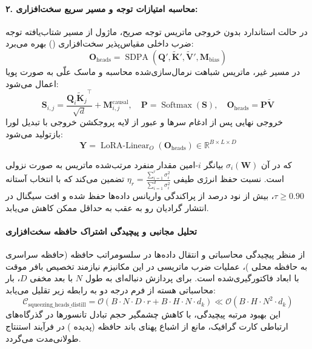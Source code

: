 \paragraph{۲. محاسبه امتیازات توجه و مسیر سریع سخت‌افزاری:}
در حالت استاندارد بدون خروجی ماتریس توجه صریح، ماژول از مسیر شتاب‌یافته توجه ضرب داخلی مقیاس‌پذیر سخت‌افزاری () بهره می‌برد:
\begin{equation}
\mathbf{O}_{\text{heads}} = \operatorname{SDPA}\left(\mathbf{Q}', \tilde{\mathbf{K}}', \tilde{\mathbf{V}}', \mathbf{M}_{\text{bias}}\right)
\end{equation}
در مسیر غیر‌، ماتریس شباهت نرمال‌سازی‌شده محاسبه و ماسک علّی به صورت پویا اعمال می‌شود:
\begin{equation}
\mathbf{S}_{i, j} = \frac{\mathbf{Q}_i {\tilde{\mathbf{K}}_j}^\top}{\sqrt{d}} + \mathbf{M}_{i, j}^{\text{causal}}, \quad \mathbf{P} = \operatorname{Softmax}(\mathbf{S}), \quad \mathbf{O}_{\text{heads}} = \mathbf{P} \tilde{\mathbf{V}}
\end{equation}
خروجی نهایی پس از ادغام سرها و عبور از لایه پروجکشن خروجی با تبدیل لورا بازتولید می‌شود:
\begin{equation}
\mathbf{Y} = \operatorname{LoRA-Linear}_O(\mathbf{O}_{\text{heads}}) \in \mathbb{R}^{B \times L \times D}
\end{equation}

که در آن $\sigma_i(\mathbf{W})$ بیانگر $i$-امین مقدار منفرد مرتب‌شده ماتریس به صورت نزولی است. نسبت حفظ انرژی طیفی $\eta_r = \frac{\sum_{i=1}^r \sigma_i^2}{\sum_{i=1}^{d} \sigma_i^2}$ تضمین می‌کند که با انتخاب آستانه $\tau \ge 0.90$، بیش از نود درصد از پراکندگی واریانس داده‌ها حفظ شده و افت سیگنال در انتشار گرادیان رو به عقب به حداقل ممکن کاهش می‌یابد.

\paragraph{تحلیل مجانبی و پیچیدگی اشتراک حافظه سخت‌افزاری}
از منظر پیچیدگی محاسباتی و انتقال داده‌ها در سلسومراتب حافظه (حافظه سراسری  به حافظه محلی )، عملیات ضرب ماتریسی در این مکانیزم نیازمند تخصیص بافر موقت با ابعاد فاکتورگیری‌شده است. برای پردازش دنباله‌ای به طول $N$ با بعد مخفی $D$، بار محاسباتی هسته از فرم درجه دو به رابطه زیر تقلیل می‌یابد:
\begin{equation}
\label{eq:complexity_squeezing_heads_distill}
\mathcal{C}_{\text{squeezing\_heads\_distill}} = \mathcal{O}\left( B \cdot N \cdot D \cdot r + B \cdot H \cdot N \cdot d_k \right) \ll \mathcal{O}\left( B \cdot H \cdot N^2 \cdot d_k \right)
\end{equation}
این بهبود مرتبه پیچیدگی، با کاهش چشمگیر حجم تبادل تانسورها در گذرگاه‌های ارتباطی کارت گرافیک، مانع از اشباع پهنای باند حافظه (پدیده ) در فرآیند استنتاج طولانی‌مدت می‌گردد.
